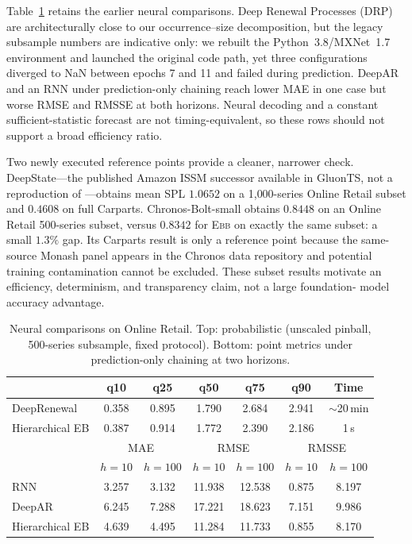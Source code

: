 \documentclass[twoside]{article}
\theoremstyle{definition}
\newcommand{\EBB}{\textsc{Ebb}}
\begin{document}
Table~\ref{tab:neural} retains the earlier neural comparisons. Deep
Renewal Processes (DRP) \citep{turkmen2019} are architecturally close to
our occurrence--size decomposition, but the legacy subsample numbers are
indicative only: we rebuilt the Python~3.8/MXNet~1.7 environment and
launched the original code path, yet three configurations diverged to
NaN between epochs 7 and 11 and failed during prediction. DeepAR and an
RNN under prediction-only chaining reach lower MAE in one case but worse
RMSE and RMSSE at both horizons. Neural decoding and a constant
sufficient-statistic forecast are not timing-equivalent, so these rows
should not support a broad efficiency ratio.

Two newly executed reference points provide a cleaner, narrower check.
DeepState---the published Amazon ISSM successor available in GluonTS,
not a reproduction of \citet{seeger2016}---obtains mean SPL $1.0652$ on
a 1{,}000-series Online Retail subset and $0.4608$ on full Carparts.
Chronos-Bolt-small obtains $0.8448$ on an Online Retail 500-series subset,
versus $0.8342$ for \EBB{} on exactly the same subset: a small $1.3\%$
gap. Its Carparts result is only a reference point because the same-source
Monash panel appears in the Chronos data repository and potential training
contamination cannot be excluded. These subset results motivate an
efficiency, determinism, and transparency claim, not a large foundation-
model accuracy advantage.

\begin{table}[t]
\centering
\caption{Neural comparisons on Online Retail. Top: probabilistic
(unscaled pinball, 500-series subsample, fixed protocol). Bottom: point
metrics under prediction-only chaining at two horizons.}
\label{tab:neural}
\small
\setlength{\tabcolsep}{4pt}
\begin{tabular}{lcccccc}
\toprule
 & q10 & q25 & q50 & q75 & q90 & Time\\
\midrule
DeepRenewal & 0.358 & 0.895 & 1.790 & 2.684 & 2.941 & $\sim$20\,min\\
Hierarchical EB & 0.387 & 0.914 & 1.772 & 2.390 & 2.186 & 1\,s\\
\midrule
 & \multicolumn{2}{c}{MAE} & \multicolumn{2}{c}{RMSE} & \multicolumn{2}{c}{RMSSE}\\
 & $h{=}10$ & $h{=}100$ & $h{=}10$ & $h{=}100$ & $h{=}10$ & $h{=}100$\\
\midrule
RNN & 3.257 & 3.132 & 11.938 & 12.538 & 0.875 & 8.197\\
DeepAR & 6.245 & 7.288 & 17.221 & 18.623 & 7.151 & 9.986\\
Hierarchical EB & 4.639 & 4.495 & 11.284 & 11.733 & 0.855 & 8.170\\
\bottomrule
\end{tabular}
\end{table}
\end{document}
